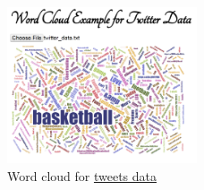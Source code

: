 \documentclass[a4paper, 11pt]{article}
\begin{document}
\begin{figure}[h!]
  \centering
      \includegraphics[width=0.5\textwidth]{word_cloud.png}
  \caption{Word cloud for \href{http://nymph332088.github.io/CIS4340/labassignments/Lab2/twitter_data.txt}{tweets data}}
  \label{fig:wordcloud}
\end{figure}
\end{document}
